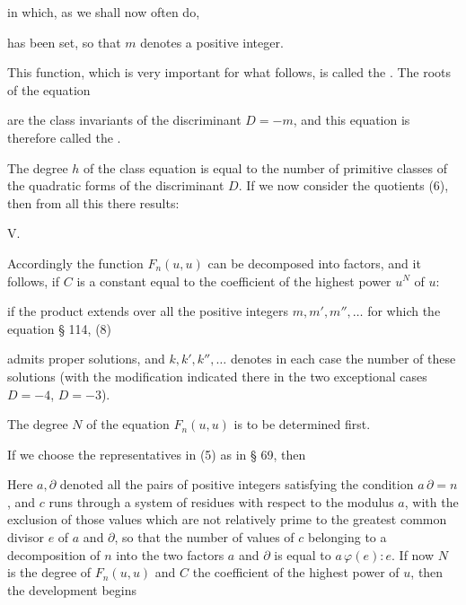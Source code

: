 in which, as we shall now often do,


has been set, so that $m$ denotes a positive integer.

This function, which is very important for what follows, is called the . The roots of the equation


are the class invariants of the discriminant $D = -m$, and this equation is therefore called the .

The degree $h$ of the class equation is equal to the number of primitive classes of the quadratic forms of the discriminant $D$. If we now consider the quotients (6), then from all this there results:

V. 

Accordingly the function $F_n(u, u)$ can be decomposed into factors, and it follows, if $C$ is a constant equal to the coefficient of the highest power $u^N$ of $u$:


if the product extends over all the positive integers $m, m', m'', \ldots$ for which the equation § 114, (8)


admits proper solutions, and $k, k', k'', \ldots$ denotes in each case the number of these solutions (with the modification indicated there in the two exceptional cases $D = -4$, $D = -3$).

The degree $N$ of the equation $F_n(u, u)$ is to be determined first.

If we choose the representatives in (5) as in § 69, then


Here $a, \partial$ denoted all the pairs of positive integers satisfying the condition $a\,\partial = n$, %
and $c$ runs through a system of residues with respect to the modulus $a$, with the exclusion of those values which are not relatively prime to the greatest common divisor $e$ of $a$ and $\partial$, so that the number of values of $c$ belonging to a decomposition of $n$ into the two factors $a$ and $\partial$ is equal to $a\,\varphi(e){:}e$. If now $N$ is the degree of $F_n(u, u)$ and $C$ the coefficient of the highest power of $u$, then the development begins
